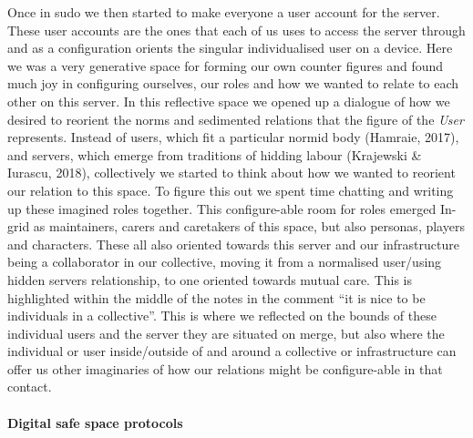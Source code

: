 Once in sudo we then started to make everyone a user account for the
server. These user accounts are the ones that each of us uses to access
the server through and as a configuration orients the singular
individualised user on a device. Here we was a very generative space for
forming our own counter figures and found much joy in configuring
ourselves, our roles and how we wanted to relate to each other on this
server. In this reflective space we opened up a dialogue of how we
desired to reorient the norms and sedimented relations that the figure
of the \emph{User} represents. Instead of users, which fit a particular
normid body (Hamraie, 2017), and servers, which emerge from traditions
of hidding labour (Krajewski \& Iurascu, 2018), collectively we started
to think about how we wanted to reorient our relation to this space. To
figure this out we spent time chatting and writing up these imagined
roles together. This configure-able room for roles emerged In-grid as
maintainers, carers and caretakers of this space, but also personas,
players and characters. These all also oriented towards this server and
our infrastructure being a collaborator in our collective, moving it
from a normalised user/using hidden servers relationship, to one
oriented towards mutual care. This is highlighted within the middle of
the notes in the comment ``it is nice to be individuals in a
collective''. This is where we reflected on the bounds of these
individual users and the server they are situated on merge, but also
where the individual or user inside/outside of and around a collective
or infrastructure can offer us other imaginaries of how our relations
might be configure-able in that contact.

\hypertarget{digital-safe-space-protocols}{%
\paragraph[Digital safe space
protocols]{\texorpdfstring{\protect\hypertarget{anchor}{}{}Digital safe
space
protocols}{Digital safe space protocols}}\label{digital-safe-space-protocols}}

